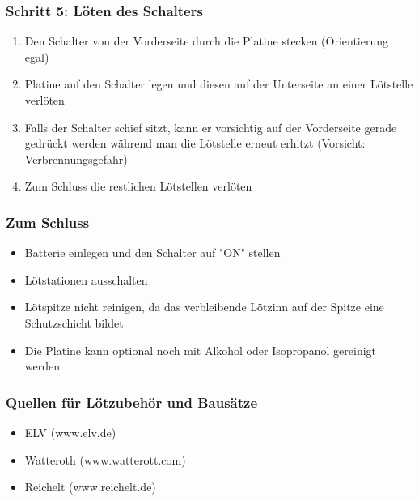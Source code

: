 \documentclass[10pt]{beamer}
\begin{document}
	\begin{frame}
	\frametitle{Schritt 5: Löten des Schalters}
	\begin{enumerate} 
		\item{Den Schalter von der Vorderseite durch die Platine stecken (Orientierung egal)}
		\item{Platine auf den Schalter legen und diesen auf der Unterseite an einer Lötstelle verlöten}
		\item{Falls der Schalter schief sitzt, kann er vorsichtig auf der Vorderseite gerade gedrückt werden während man die Lötstelle erneut erhitzt (Vorsicht: Verbrennungsgefahr)}
		\item{Zum Schluss die restlichen Lötstellen verlöten}
	\end{enumerate}
	\end{frame}

	\begin{frame}
	\frametitle{Zum Schluss}
	\begin{itemize} 
		\item{Batterie einlegen und den Schalter auf "ON" stellen}
		\item{Lötstationen ausschalten}
		\item{Lötspitze nicht reinigen, da das verbleibende Lötzinn auf der Spitze eine Schutzschicht bildet}
		\item{Die Platine kann optional noch mit Alkohol oder Isopropanol gereinigt werden}
	\end{itemize}
\end{frame}

	\begin{frame}
		\frametitle{Quellen für Lötzubehör und Bausätze}
		\begin{itemize}
			\item{ELV (www.elv.de)}
			\item{Watteroth (www.watterott.com)}
			\item{Reichelt (www.reichelt.de)}
		\end{itemize}
	\end{frame}

    
\end{document}
